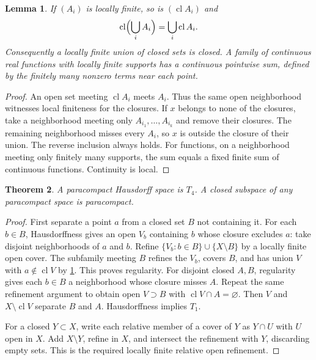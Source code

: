 \documentclass[11pt,oneside,openany]{book}
\newtheorem{theorem}{Theorem}[chapter]
\newtheorem{lemma}[theorem]{Lemma}
\theoremstyle{definition}
\theoremstyle{remark}
\DeclareMathOperator{\cl}{cl}
\begin{document}
\begin{lemma}\label{d10:15:closure-sums}
If $(A_i)$ is locally finite, so is $(\cl A_i)$ and
\[
 \cl\Bigl(\bigcup_i A_i\Bigr)=\bigcup_i\cl A_i.
\]
Consequently a locally finite union of closed sets is closed. A family of
continuous real functions with locally finite supports has a continuous
pointwise sum, defined by the finitely many nonzero terms near each point.
\end{lemma}
\begin{proof}
An open set meeting $\cl A_i$ meets $A_i$. Thus the same open neighborhood
witnesses local finiteness for the closures. If $x$ belongs to none of the
closures, take a neighborhood meeting only $A_{i_1},\ldots,A_{i_k}$ and remove
their closures. The remaining neighborhood misses every $A_i$, so $x$ is
outside the closure of their union. The reverse inclusion always holds.
For functions, on a neighborhood meeting only finitely many supports, the
sum equals a fixed finite sum of continuous functions. Continuity is local.
\end{proof}

\begin{theorem}\label{d10:15:normal}
A paracompact Hausdorff space is $T_4$. A closed subspace of any
paracompact space is paracompact.
\end{theorem}
\begin{proof}
First separate a point $a$ from a closed set $B$ not containing it.
For each $b\in B$, Hausdorffness gives an open $V_b$ containing $b$ whose
closure excludes $a$: take disjoint neighborhoods of $a$ and $b$.
Refine $\{V_b:b\in B\}\cup\{X\setminus B\}$ by a locally finite open cover.
The subfamily meeting $B$ refines the $V_b$, covers $B$, and has union $V$
with $a\notin\cl V$ by \cref{d10:15:closure-sums}. This proves regularity.
For disjoint closed $A,B$, regularity gives each $b\in B$ a neighborhood
whose closure misses $A$. Repeat the same refinement argument to obtain
open $V\supset B$ with $\cl V\cap A=\varnothing$. Then $V$ and
$X\setminus\cl V$ separate $B$ and $A$. Hausdorffness implies $T_1$.

For a closed $Y\subset X$, write each relative member of a cover of $Y$
as $Y\cap U$ with $U$ open in $X$. Add $X\setminus Y$, refine in $X$,
and intersect the refinement with $Y$, discarding empty sets. This is the
required locally finite relative open refinement.
\end{proof}
\end{document}
